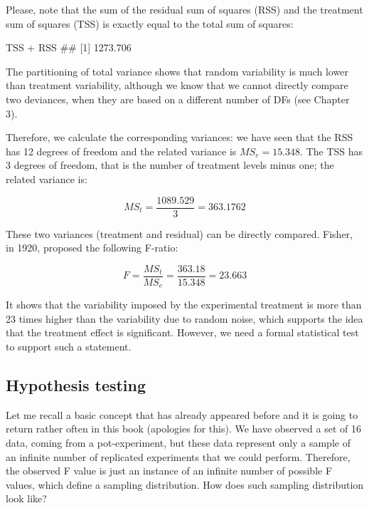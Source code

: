 \documentclass[a4paper,12pt,oneside]{book}
\newenvironment{Shaded}{\begin{snugshade}}{\end{snugshade}}
\newcommand{\SpecialCharTok}[1]{#1}
\newcommand{\DocumentationTok}[1]{#1}
\newcommand{\NormalTok}[1]{#1}
\begin{document}
Please, note that the sum of the residual sum of squares (RSS) and the treatment sum of squares (TSS) is exactly equal to the total sum of squares:

\vspace{12pt}

\begin{Shaded}
\begin{Highlighting}[]
\NormalTok{TSS }\SpecialCharTok{+}\NormalTok{ RSS}
\DocumentationTok{\#\# [1] 1273.706}
\end{Highlighting}
\end{Shaded}

The partitioning of total variance shows that random variability is much lower than treatment variability, although we know that we cannot directly compare two deviances, when they are based on a different number of DFs (see Chapter 3).

Therefore, we calculate the corresponding variances: we have seen that the RSS has 12 degrees of freedom and the related variance is \(MS_e = 15.348\). The TSS has 3 degrees of freedom, that is the number of treatment levels minus one; the related variance is:

\[MS_t = \frac{1089.529}{3} = 363.1762\]

These two variances (treatment and residual) can be directly compared. Fisher, in 1920, proposed the following F-ratio:

\[F = \frac{MS_t}{MS_e} = \frac{363.18}{15.348} = 23.663\]

It shows that the variability imposed by the experimental treatment is more than 23 times higher than the variability due to random noise, which supports the idea that the treatment effect is significant. However, we need a formal statistical test to support such a statement.

\hypertarget{hypothesis-testing}{%
\subsection{Hypothesis testing}\label{hypothesis-testing}}

Let me recall a basic concept that has already appeared before and it is going to return rather often in this book (apologies for this). We have observed a set of 16 data, coming from a pot-experiment, but these data represent only a sample of an infinite number of replicated experiments that we could perform. Therefore, the observed F value is just an instance of an infinite number of possible F values, which define a sampling distribution. How does such sampling distribution look like?
\end{document}
